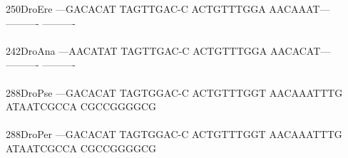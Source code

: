 \documentclass[11pt,twoside,reqno,a4paper]{article}
\begin{document}
{250\hspace*{1\charwidth}DroEre	---GACACAT	TAGTTGAC-C	ACTGTTTGGA	AACAAAT---	----------	----------	\\
\hspace*{4\charwidth}\hspace*{7\charwidth}\hspace*{1\charwidth}\hspace*{1\charwidth}\hspace*{1\charwidth}\hspace*{1\charwidth}\hspace*{1\charwidth}\hspace*{1\charwidth}\\
242\hspace*{1\charwidth}DroAna	---AACATAT	TAGTTGAC-C	ACTGTTTGGA	AACACAT---	----------	----------	\\
\hspace*{4\charwidth}\hspace*{7\charwidth}\hspace*{1\charwidth}\hspace*{1\charwidth}\hspace*{1\charwidth}\hspace*{1\charwidth}\hspace*{1\charwidth}\hspace*{1\charwidth}\\
288\hspace*{1\charwidth}DroPse	---GACACAT	TAGTGGAC-C	ACTGTTTGGT	AACAAATTTG	ATAATCGCCA	CGCCGGGGCG	\\
\hspace*{4\charwidth}\hspace*{7\charwidth}\hspace*{1\charwidth}\hspace*{1\charwidth}\hspace*{1\charwidth}\hspace*{1\charwidth}\hspace*{1\charwidth}\hspace*{1\charwidth}\\
288\hspace*{1\charwidth}DroPer	---GACACAT	TAGTGGAC-C	ACTGTTTGGT	AACAAATTTG	ATAATCGCCA	CGCCGGGGCG	\\
\hspace*{4\charwidth}\hspace*{7\charwidth}\hspace*{1\charwidth}\hspace*{1\charwidth}\hspace*{1\charwidth}\hspace*{1\charwidth}\hspace*{1\charwidth}\hspace*{1\charwidth}\\
}
\end{document}

